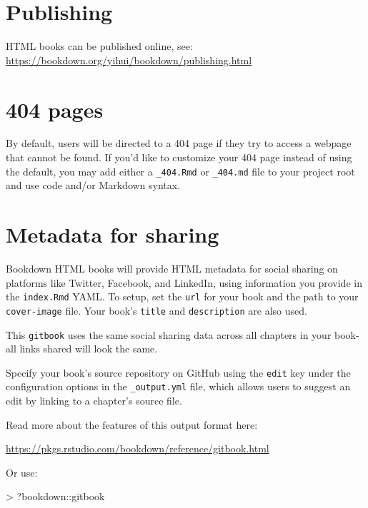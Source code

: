 \documentclass[
]{book}
\newenvironment{Shaded}{\begin{snugshade}}{\end{snugshade}}
\newcommand{\NormalTok}[1]{#1}
\newcommand{\SpecialCharTok}[1]{\textcolor[rgb]{0.00,0.00,0.00}{#1}}
\theoremstyle{definition}
\theoremstyle{definition}
\theoremstyle{definition}
\theoremstyle{definition}
\theoremstyle{remark}
\begin{document}
\hypertarget{publishing}{%
\section{Publishing}\label{publishing}}

HTML books can be published online, see: \url{https://bookdown.org/yihui/bookdown/publishing.html}

\hypertarget{pages}{%
\section{404 pages}\label{pages}}

By default, users will be directed to a 404 page if they try to access a webpage that cannot be found. If you'd like to customize your 404 page instead of using the default, you may add either a \texttt{\_404.Rmd} or \texttt{\_404.md} file to your project root and use code and/or Markdown syntax.

\hypertarget{metadata-for-sharing}{%
\section{Metadata for sharing}\label{metadata-for-sharing}}

Bookdown HTML books will provide HTML metadata for social sharing on platforms like Twitter, Facebook, and LinkedIn, using information you provide in the \texttt{index.Rmd} YAML. To setup, set the \texttt{url} for your book and the path to your \texttt{cover-image} file. Your book's \texttt{title} and \texttt{description} are also used.

This \texttt{gitbook} uses the same social sharing data across all chapters in your book- all links shared will look the same.

Specify your book's source repository on GitHub using the \texttt{edit} key under the configuration options in the \texttt{\_output.yml} file, which allows users to suggest an edit by linking to a chapter's source file.

Read more about the features of this output format here:

\url{https://pkgs.rstudio.com/bookdown/reference/gitbook.html}

Or use:

\begin{Shaded}
\begin{Highlighting}[]
\SpecialCharTok{\textgreater{}}\NormalTok{ ?bookdown}\SpecialCharTok{::}\NormalTok{gitbook}
\end{Highlighting}
\end{Shaded}


  
\end{document}
